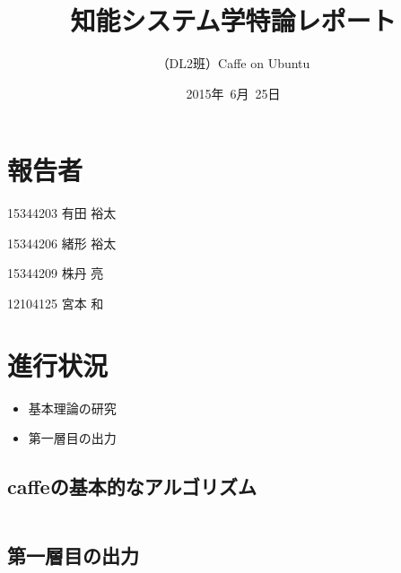 \documentclass[a4paper,10pt]{jsarticle}
\title{知能システム学特論レポート}
\author{
（DL2班）Caffe on Ubuntu\\
}
\date{2015年\ 6月\ 25日}
\begin{document}
\maketitle
\section{報告者}
\begin{list}{}{}
 \item 15344203\hspace{0.5cm} 有田 裕太
 \item 15344206\hspace{0.5cm} 緒形 裕太
 \item 15344209\hspace{0.5cm} 株丹 亮
 \item 12104125\hspace{0.5cm} 宮本 和
\end{list}

\section{進行状況}
\begin{itemize}
\item 基本理論の研究
\item 第一層目の出力
\end{itemize}
\subsection{caffeの基本的なアルゴリズム}
\begin{lstlisting}[basicstyle=\ttfamily\footnotesize, frame=single, firstnumber=254, numbers=left]

\end{lstlisting}

\subsection{第一層目の出力}

\begin{lstlisting}[basicstyle=\ttfamily\footnotesize, frame=single]

\end{lstlisting}
\end{document}
